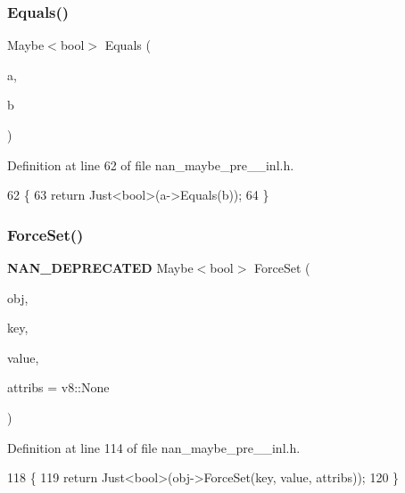 \subsubsection{Equals()}
{\footnotesize\ttfamily Maybe$<$bool$>$ Equals (\begin{DoxyParamCaption}\item[{v8\+::\+Handle$<$ v8\+::\+Value $>$}]{a,  }\item[{v8\+::\+Handle$<$ v8\+::\+Value $>$}]{b }\end{DoxyParamCaption})}



Definition at line 62 of file nan\+\_\+maybe\+\_\+pre\+\_\+\_\+inl.\+h.


\begin{DoxyCode}
62                                                               \{
63   \textcolor{keywordflow}{return} Just<bool>(a->Equals(b));
64 \}
\end{DoxyCode}
\mbox{\label{nan__maybe__pre__43__inl_8h_a92e3e4025704368f3ac123e506df1a6c}} 
\subsubsection{Force\+Set()}
{\footnotesize\ttfamily \textbf{ N\+A\+N\+\_\+\+D\+E\+P\+R\+E\+C\+A\+T\+ED} Maybe$<$bool$>$ Force\+Set (\begin{DoxyParamCaption}\item[{v8\+::\+Handle$<$ v8\+::\+Object $>$}]{obj,  }\item[{v8\+::\+Handle$<$ v8\+::\+Value $>$}]{key,  }\item[{v8\+::\+Handle$<$ v8\+::\+Value $>$}]{value,  }\item[{v8\+::\+Property\+Attribute}]{attribs = {\ttfamily v8\+:\+:None} }\end{DoxyParamCaption})}



Definition at line 114 of file nan\+\_\+maybe\+\_\+pre\+\_\+\_\+inl.\+h.


\begin{DoxyCode}
118                                           \{
119   \textcolor{keywordflow}{return} Just<bool>(obj->ForceSet(key, value, attribs));
120 \}
\end{DoxyCode}
\mbox{\label{nan__maybe__pre__43__inl_8h_a11fba5a078c978006d34fa9da0a3afb3}} 
